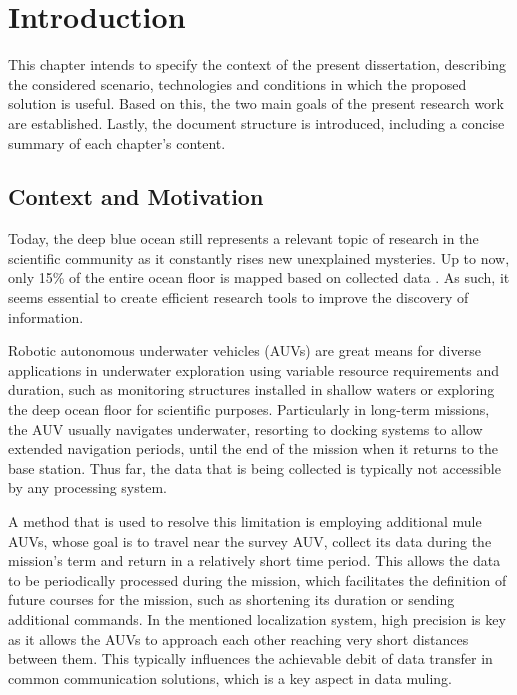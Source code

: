 \chapter{Introduction} \label{chap:intro}

This chapter intends to specify the context of the present dissertation, describing the considered scenario, technologies and conditions in which the proposed solution is useful. Based on this, the two main goals of the present research work are established. Lastly, the document structure is introduced, including a concise summary of each chapter's content.

\section{Context and Motivation} \label{sec:context}

Today, the deep blue ocean still represents a relevant topic of research in the scientific community as it constantly rises new unexplained mysteries. Up to now, only 15\% of the entire ocean floor is mapped based on collected data \cite{deeperblue}. As such, it seems essential to create efficient research tools to improve the discovery of information.

Robotic autonomous underwater vehicles (AUVs) are great means for diverse applications in underwater exploration using variable resource requirements and duration, such as monitoring structures installed in shallow waters or exploring the deep ocean floor for scientific purposes. Particularly in long-term missions, the AUV usually navigates underwater, resorting to docking systems to allow extended navigation periods, until the end of the mission when it returns to the base station. Thus far, the data that is being collected is typically not accessible by any processing system. 

A method that is used to resolve this limitation is employing additional mule AUVs, whose goal is to travel near the survey AUV, collect its data during the mission's term and return in a relatively short time period. This allows the data to be periodically processed during the mission, which facilitates the definition of future courses for the mission, such as shortening its duration or sending additional commands. In the mentioned localization system, high precision is key as it allows the AUVs to approach each other reaching very short distances between them. This typically influences the achievable debit of data transfer in common communication solutions, which is a key aspect in data muling.

